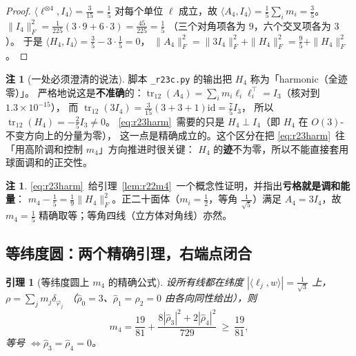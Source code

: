 \documentclass[UTF8,11pt]{ctexart}
\newtheorem{lemma}[theorem]{引理}
\theoremstyle{definition}
\newtheorem{remark}[theorem]{注}
\begin{document}
\begin{proof}
$\langle\ell^{\otimes4},I_4\rangle=\frac3{15}=\frac15$ 对每个单位 $\ell$ 成立，故
$\langle A_4,I_4\rangle=\frac15\sum_im_i=\frac35$。
$\|I_4\|_F^2=\frac1{225}(3\cdot9+6\cdot3)=\frac{45}{225}=\frac15$
（三个对角项各为 $9$，六个交叉项各为 $3$）。
于是 $\langle H_4,I_4\rangle=\frac35-3\cdot\frac15=0$，
$\|A_4\|_F^2=\|3I_4\|_F^2+\|H_4\|_F^2=\frac95+\|H_4\|_F^2$。
\end{proof}

\begin{remark}[一处必须澄清的说法]\label{rem:r23harm}
脚本 \texttt{\_r23c.py} 的输出把 $H_4$ 称为「harmonic（全迹零）」。
严格地说这是\textbf{不准确}的：$\operatorname{tr}_{12}(A_4)=\sum_im_i\ell_i\ell_i^\top=I_3$（核对到 $1.3\times10^{-15}$），
而 $\operatorname{tr}_{12}(3I_4)=\frac3{15}(3+3+1)\mathrm{id}=\frac75I_3$，
所以 $\operatorname{tr}_{12}(H_4)=-\frac25I_3\ne0$。
\eqref{eq:r23harm}~需要的只是 $H_4\perp I_4$（即 $H_4$ 在 $O(3)$-不变方向上的分量为零），
这一点是精确成立的。这个区分在把 \eqref{eq:r23harm}~往「用高阶调和控制 $m_4$」方向推进时很关键：
$H_4$ 的\textbf{迹}不为零，所以不能直接套用球面调和的正交性。
\end{remark}

\begin{remark}
\eqref{eq:r23harm}~给引理~\ref{lem:r22m4}~一个概念性证明，并指出\textbf{亏格就是调和能量}：
$m_4-\frac15=\frac19\|H_4\|_F^2$。正二十面体（$m_i=\frac12$，等角 $\frac1{\sqrt5}$）满足
$A_4=3I_4$，故 $m_4=\frac15$ 精确取等；等角四线（立方体对角线）亦然。
\end{remark}

\subsection{等纬度圆：两个精确引理，右端点闭合}\label{sec:r23:equi}

\begin{lemma}[等纬度圆上 $m_4$ 的精确公式]\label{lem:r23m4eq}
设所有线都在纬度 $|\langle\ell_j,w\rangle|=\frac1{\sqrt3}$ 上，$\rho=\sum_jm_j\delta_{\varphi_j}$
（$\hat\rho_0=3$、$\hat\rho_1=\hat\rho_2=0$ 由各向同性给出），则
\begin{equation}\label{eq:r23m4eq}
m_4=\frac{19}{81}+\frac{8|\hat\rho_3|^2+2|\hat\rho_4|^2}{729}\ \ge\ \frac{19}{81},
\end{equation}
等号 $\iff\hat\rho_3=\hat\rho_4=0$。
\end{lemma}
\end{document}
